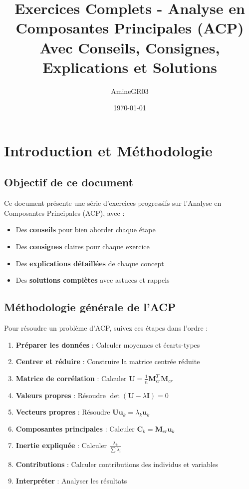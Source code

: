 \documentclass[11pt,a4paper]{article}
\title{Exercices Complets - Analyse en Composantes Principales (ACP)\\
\large Avec Conseils, Consignes, Explications et Solutions}
\author{AmineGR03}
\date{\today}
\begin{document}
\maketitle

\tableofcontents
\newpage

\section{Introduction et Méthodologie}

\subsection{Objectif de ce document}

Ce document présente une série d'exercices progressifs sur l'Analyse en Composantes Principales (ACP), avec :
\begin{itemize}
    \item Des \textbf{conseils} pour bien aborder chaque étape
    \item Des \textbf{consignes} claires pour chaque exercice
    \item Des \textbf{explications détaillées} de chaque concept
    \item Des \textbf{solutions complètes} avec astuces et rappels
\end{itemize}

\subsection{Méthodologie générale de l'ACP}

Pour résoudre un problème d'ACP, suivez ces étapes dans l'ordre :

\begin{enumerate}
    \item \textbf{Préparer les données} : Calculer moyennes et écarts-types
    \item \textbf{Centrer et réduire} : Construire la matrice centrée réduite
    \item \textbf{Matrice de corrélation} : Calculer $\mathbf{U} = \frac{1}{n}\mathbf{M}_{cr}^T\mathbf{M}_{cr}$
    \item \textbf{Valeurs propres} : Résoudre $\det(\mathbf{U} - \lambda\mathbf{I}) = 0$
    \item \textbf{Vecteurs propres} : Résoudre $\mathbf{U}\mathbf{u}_k = \lambda_k\mathbf{u}_k$
    \item \textbf{Composantes principales} : Calculer $\mathbf{C}_k = \mathbf{M}_{cr}\mathbf{u}_k$
    \item \textbf{Inertie expliquée} : Calculer $\frac{\lambda_k}{\sum \lambda_i}$
    \item \textbf{Contributions} : Calculer contributions des individus et variables
    \item \textbf{Interpréter} : Analyser les résultats
\end{enumerate}
\end{document}

